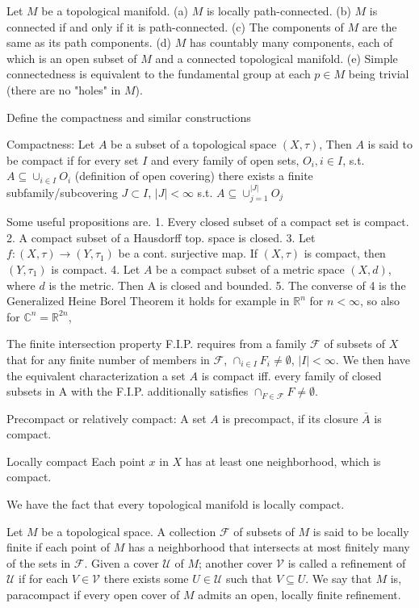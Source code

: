 Let \( M \) be a topological manifold.
(a) \( M \) is locally path-connected.
(b) \( M \) is connected if and only if it is path-connected.
(c) The components of \( M \) are the same as its path components.
(d) \( M \) has countably many components, each of which is an open subset of \( M \) and
a connected topological manifold.
(e) Simple connectedness is equivalent to the fundamental group at each \(p \in M \) being trivial 
(there are no "holes" in \( M \)).


Define the compactness and similar constructions

Compactness:
Let \( A \) be a subset of a topological space \( (X, \tau) \),
Then \( A \) is said to be compact if for every set \( I \) and every family of open sets, 
\( O_i, i \in I \), s.t. \( A \subseteq \cup_{i \in I} O_i \) (definition of open covering) there exists
a finite subfamily/subcovering \( J \subset I \), \( |J| < \infty \) s.t. \( A \subseteq \cup_{j=1}^{|J|} O_j \)

Some useful propositions are.
1. Every closed subset of a compact set is compact.
2. A compact subset of a Hausdorff top. space is closed.
3. Let \( f : (X, \tau) \to (Y, \tau_1) \) be a cont. surjective map. If \( (X, \tau) \) is compact, then \( (Y, \tau_1) \) is compact.
4. Let \( A \) be a compact subset of a metric space \( (X, d) \), where \( d \) is the metric.
   Then A is closed and bounded.
5. The converse of 4 is the Generalized Heine Borel Theorem it holds for example in \( \mathbb{R}^n \) for \( n < \infty \), so also for \( \mathbb{C}^n = \mathbb{R}^{2n}\),

The finite intersection property F.I.P. requires from a family \( \mathcal{F} \) of subsets of \( X \) that for any finite number 
of members in \( \mathcal{F} \), \( \cap_{i \in I} F_i  \neq \emptyset \), \( |I| < \infty \).
We then have the equivalent characterization a set \( A \) is compact iff. every family of closed subsets in A
with the F.I.P. additionally satisfies \( \cap_{F \in \mathcal{F}} F \neq \emptyset \).

Precompact or relatively compact:
A set \( A \) is precompact, if its closure \( \bar{A} \) is compact.

Locally compact
Each point \( x \) in \( X \) has at least one neighborhood, which is compact.

We have the fact that every topological manifold is locally compact.

Let \( M \) be a topological space. A collection \( \mathcal{F} \) of subsets of \( M \) is said to be locally
finite if each point of \( M \) has a neighborhood that intersects at most finitely many
of the sets in \( \mathcal{F} \). Given a cover \( \mathcal{U} \) of \( M \); another cover \( \mathcal{V} \) is called a refinement of
\( \mathcal{U} \) if for each \( V \in \mathcal{V} \) there exists some \( U \in \mathcal{U} \) such that \( V \subseteq U \). 
We say that \( M \) is, paracompact if every open cover of \( M \) admits an open, locally finite refinement.

